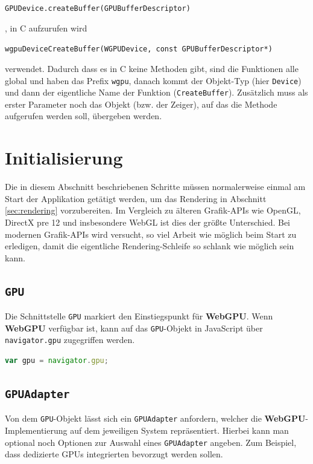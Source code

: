 \documentclass[oneside]{ausarbeitung}
\newcommand*{\quotize}[1]{\glqq #1\grqq}
\begin{document}
\texttt{GPUDevice.createBuffer(GPUBufferDescriptor)}

, in C aufzurufen wird 

\texttt{wgpuDeviceCreateBuffer(WGPUDevice, const GPUBufferDescriptor*)}

verwendet. Dadurch dass es in C keine Methoden gibt, sind die Funktionen alle global und haben das Prefix \texttt{wgpu}, danach kommt der Objekt-Typ (hier \texttt{Device}) und dann der eigentliche Name der Funktion (\texttt{CreateBuffer}). Zusätzlich muss als erster Parameter noch das Objekt (bzw. der Zeiger), auf das die Methode aufgerufen werden soll, übergeben werden.

\section{Initialisierung}
Die in diesem Abschnitt beschriebenen Schritte müssen normalerweise einmal am Start der Applikation getätigt werden, um das Rendering in Abschnitt \ref{sec:rendering} vorzubereiten. Im Vergleich zu \quotize{älteren} Grafik-APIs wie OpenGL, DirectX pre 12 und insbesondere WebGL ist dies der größte Unterschied. Bei \quotize{modernen} Grafik-APIs wird versucht, so viel Arbeit wie möglich beim Start zu erledigen, damit die eigentliche Rendering-Schleife so \quotize{schlank} wie möglich sein kann.

\subsection{\texttt{GPU}}
Die Schnittstelle \texttt{GPU} markiert den Einstiegspunkt für \textbf{WebGPU}. Wenn \textbf{WebGPU} verfügbar ist, kann auf das \texttt{GPU}-Objekt in JavaScript über \texttt{navigator.gpu} zugegriffen werden.

\begin{lstlisting}[language=JavaScript]
var gpu = navigator.gpu;
\end{lstlisting}

\subsection{\texttt{GPUAdapter}}

Von dem \texttt{GPU}-Objekt lässt sich ein \texttt{GPUAdapter} anfordern, welcher die \textbf{WebGPU}-Implementierung auf dem jeweiligen System repräsentiert. Hierbei kann man optional noch Optionen zur Auswahl eines \texttt{GPUAdapter} angeben. Zum Beispiel, dass dedizierte \ac{GPU}s integrierten bevorzugt werden sollen.
\end{document}
